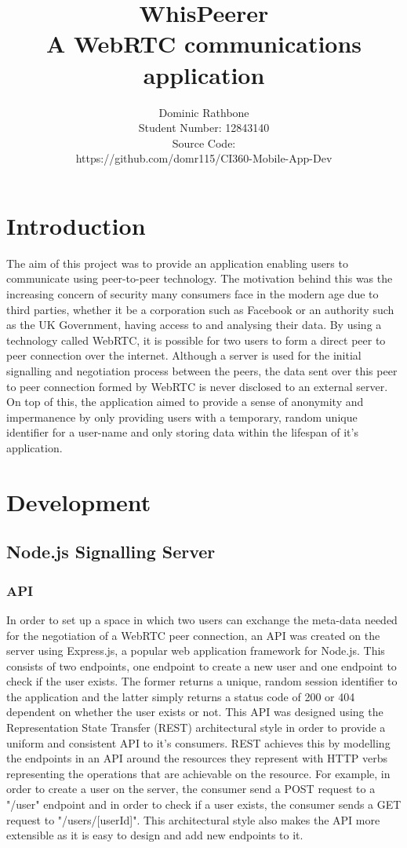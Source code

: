 \documentclass[]{report}
\title{WhisPeerer \\A WebRTC communications application}
\author{Dominic Rathbone \\ Student Number: 12843140 \\ Source Code: \\ https://github.com/domr115/CI360-Mobile-App-Dev}
\begin{document}
\maketitle

\tableofcontents

	\chapter{Introduction}
	The aim of this project was to provide an application enabling users to communicate using peer-to-peer technology. The motivation behind this was the increasing concern of security many consumers face in the modern age due to third parties, whether it be a corporation such as Facebook or an authority such as the UK Government, having access to and analysing their data. By using a technology called WebRTC, it is possible for two users to form a direct peer to peer connection over the internet.  Although a server is used for the initial signalling and negotiation process between the peers, the data sent over this peer to peer connection formed by WebRTC is never disclosed to an external server. On top of this, the application aimed to provide a sense of anonymity and impermanence by only providing users with a temporary, random unique identifier for a user-name and only storing data within the lifespan of it's application.

	\chapter{Development}
		\section{Node.js Signalling Server}
			\subsection{API}
			In order to set up a space in which two users can exchange the meta-data needed for the negotiation of a WebRTC peer connection, an API was created on the server using Express.js, a popular web application framework for Node.js. This consists of two endpoints, one endpoint to create a new user and one endpoint to check if the user exists. The former returns a unique, random session identifier to the application and the latter simply returns a status code of 200 or 404 dependent on whether the user exists or not. This API was designed using the Representation State Transfer (REST) architectural style in order to provide a uniform and consistent API to it's consumers. REST achieves this by modelling the endpoints in an API around the resources they represent with HTTP verbs representing the operations that are achievable on the resource. For example, in order to create a user on the server, the consumer send a POST request to a "/user" endpoint and in order to check if a user exists, the consumer sends a GET request to "/users/[userId]". This architectural style also makes the API more extensible as it is easy to design and add new endpoints to it.
			
\end{document}
